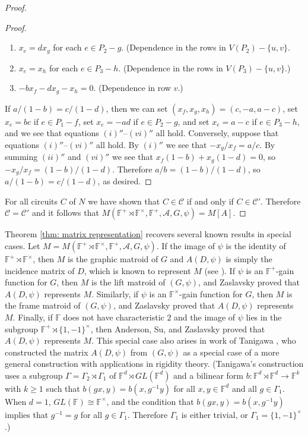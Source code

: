 \documentclass[12pt]{article}
\theoremstyle{definition}
\newcommand{\bF}{\mathbb F}
\newcommand{\cA}{\mathcal{A}}
\newcommand{\cC}{\mathcal{C}}
\begin{document}
\begin{proof}
\begin{proof}
\begin{enumerate}[label=$(\roman*)''$]
    \item $x_e = dx_g$ for each $e \in P_2 - g$. (Dependence in the rows in $V(P_2) - \{u,v\}$.

    \item $x_e = x_h$ for each $e \in P_3 - h$. (Dependence in the rows in $V(P_3) - \{u,v\}$.)

    \item $-bx_f - dx_g - x_h = 0$. (Dependence in row $v$.)
\end{enumerate}
If $a/(1-b) = c/(1-d)$, then we can set $(x_f, x_g, x_h) = (c, -a, a - c)$, set $x_e = bc$ if $e \in P_1 - f$, set $x_e = -ad$ if $e \in P_2 - g$, and set $x_e = a - c$ if $e \in P_3 - h$, and we see that equations $(i)''$--$(vi)''$ all hold.
Conversely, suppose that equations $(i)''$--$(vi)''$ all hold.
By $(i)''$ we see that $-x_g/x_f = a/c$.
By summing $(ii)''$ and $(vi)''$ we see that $x_f(1 - b) + x_g(1 - d) = 0$, so $-x_g/x_f = (1 - b)/(1 - d)$.
Therefore $a/b = (1-b)/(1-d)$, so $a/(1 - b) = c/(1 - d)$, as desired.
\end{proof}

For all circuits $C$ of $N$ we have shown that $C \in \cC$ if and only if $C \in \cC'$.
Therefore $\cC = \cC'$ and it follows that $M(\bF^{+} \rtimes \bF^{\times}, \bF^+, \cA, G, \psi) = M[A]$.
\end{proof}


Theorem \ref{thm: matrix representation} recovers several known results in special cases.
Let $M = M(\bF^{+} \rtimes \bF^{\times}, \bF^+, \cA, G, \psi)$.
If the image of $\psi$ is the identity of $\bF^+\rtimes \bF^{\times}$, then $M$ is the graphic matroid of $G$ and $A(D, \psi)$ is simply the incidence matrix of $D$, which is known to represent $M$ (see \cite[Section 5.1]{Oxley2011}).
If $\psi$ is an $\bF^+$-gain function for $G$, then $M$ is the lift matroid of $(G, \psi)$, and Zaslavsky \cite[Theorem 4.1]{Zaslavsky2003} proved that $A(D, \psi)$ represents $M$.
Similarly, if $\psi$ is an $\bF^{\times}$-gain function for $G$, then $M$ is the frame matroid of $(G, \psi)$, and Zaslavsky  \cite[Theorem 2.1]{Zaslavsky2003} proved that $A(D, \psi)$ represents $M$.
Finally, if $\bF$ does not have characteristic $2$ and the image of $\psi$ lies in the subgroup $\bF^+ \rtimes \{1,-1\}^{\times}$, then Anderson, Su, and Zaslavsky \cite[Section 3]{Anderson-Su-Zaslavsky2024} proved that $A(D, \psi)$ represents $M$.
This special case also arises in work of Tanigawa \cite[Section 9]{Tanigawa-2015}, who constructed the matrix $A(D, \psi)$ from $(G, \psi)$ as a special case of a more general construction with applications in rigidity theory.
(Tanigawa's construction uses a subgroup $\Gamma = \Gamma_2 \rtimes \Gamma_1$ of $\bF^d \rtimes GL(\bF^d)$ and a bilinear form $b \colon \bF^d \rtimes \bF^d \to \bF^k$ with $k \ge 1$ such that $b(gx, y) = b(x, g^{-1}y)$ for all $x,y \in \bF^d$ and all $g \in \Gamma_1$.
When $d = 1$, $GL(\bF) \cong \bF^{\times}$, and the condition that $b(gx, y) = b(x, g^{-1}y)$ implies that $g^{-1} = g$ for all $g \in \Gamma_1$.
Therefore $\Gamma_1$ is either trivial, or $\Gamma_1 = \{1,-1\}^{\times}$.)
\end{document}
